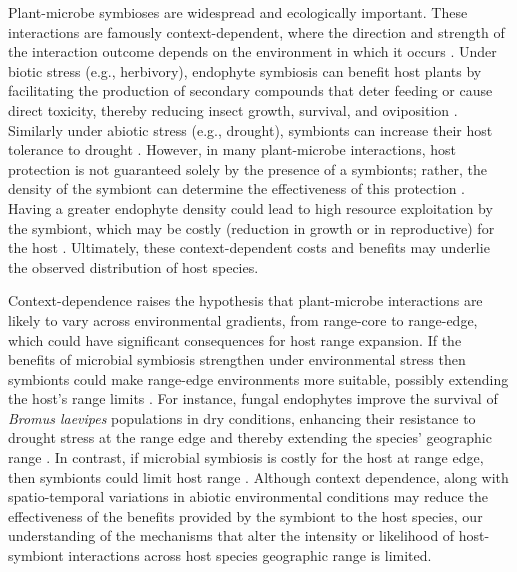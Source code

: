 \documentclass[11pt]{article}
\begin{document}
Plant-microbe symbioses are widespread and ecologically important. 
These interactions are famously context-dependent, where the direction and strength of the interaction outcome depends on the environment in which it occurs \citep{fowler2023geographic,hoeksema2015context, bronstein1994conditional}.
Under biotic stress (e.g., herbivory), endophyte symbiosis can benefit host plants by facilitating the production of secondary compounds that deter feeding or cause direct toxicity, thereby reducing insect growth, survival, and oviposition \citep{atala2022fungal,bastias2017epichloe,vega2008insect}.
Similarly under abiotic stress (e.g., drought), symbionts can increase their host tolerance to drought \citep{clay2002evolutionary}.
However, in many plant-microbe interactions, host protection is not guaranteed solely by the presence of a symbionts; rather, the density of the symbiont can determine the effectiveness of this protection \citep{laughton2014combined}. 
Having a greater endophyte density could lead to high resource exploitation by the symbiont, which may be costly (reduction in  growth  or in reproductive) for the host \citep{faeth2009asexual}.
Ultimately, these context-dependent costs and benefits may underlie the observed distribution of host species.

Context-dependence raises the hypothesis that plant-microbe interactions are likely to vary across environmental gradients, from range-core to range-edge, which could have significant consequences for host range expansion.
If the benefits of microbial symbiosis strengthen under environmental stress then symbionts could make range-edge environments more suitable, possibly extending the host’s range limits \citep{allsup2023shifting,rudgers2020climate}.
For instance, fungal endophytes improve the survival of \emph{Bromus laevipes} populations in dry conditions, enhancing their resistance to drought stress at the range edge and thereby extending the species' geographic range \citep{david2019soil,afkhami2014mutualist}.
In contrast, if microbial symbiosis is costly for the host at range edge, then symbionts could limit host range \citep{benning2021microbes,benning2021plant,bennett2022costs}.
Although context dependence, along with spatio-temporal variations in abiotic environmental conditions may reduce the effectiveness of the benefits provided by the symbiont to the host species, our understanding of the mechanisms that alter the intensity or likelihood of host-symbiont interactions across host species geographic range is limited.
\end{document}
